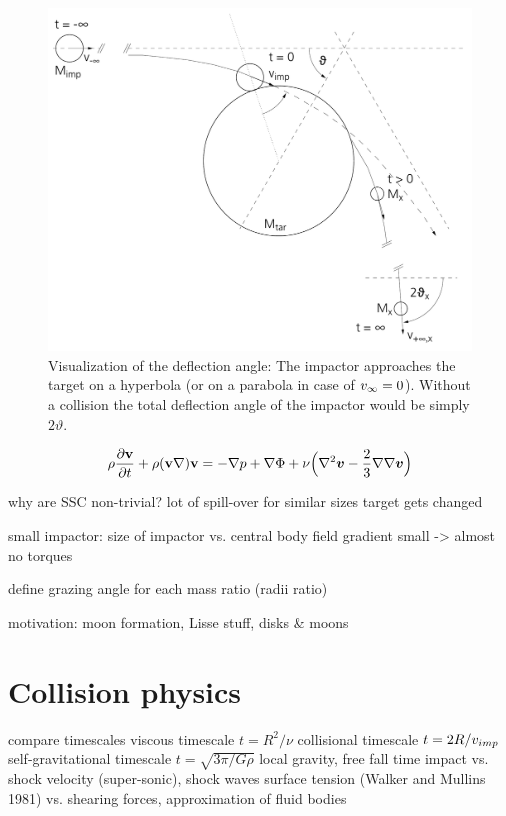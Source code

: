 \begin{figure}[htbp]
\begin{center}
\includegraphics[scale=0.5]{04_vartheta}
\caption{Visualization of the deflection angle: The impactor approaches the target on a hyperbola (or on a parabola in case of $v_{\infty} = 0$). Without a collision the total deflection angle of the impactor would be simply $2 \vartheta$.}
\label{ch03_fig02}
\end{center}
\end{figure}


\begin{equation}
\label{ch03_fld01_eq002}
\rho \frac{\partial \mathbf{v}}{\partial t} + \rho ( \mathbf{v} \nabla ) \mathbf{v} = - \nabla p + \nabla \Phi + \nu \Big( \nabla^2 \boldsymbol{v} - \frac{2}{3} \nabla \nabla \boldsymbol{v} \Big)
\end{equation}




why are SSC non-trivial?
lot of spill-over for similar sizes
target gets changed

small impactor: size of impactor vs. central body field gradient small -> almost no torques

define grazing angle for each mass ratio (radii ratio)

motivation: moon formation, Lisse stuff, disks \& moons


\section{Collision physics}
compare timescales
viscous timescale $t = R^2 / \nu$
collisional timescale $t = 2 R / v_{imp}$
self-gravitational timescale $t = \sqrt{3\pi / G \rho}$
local gravity, free fall time
impact vs. shock velocity (super-sonic), shock waves
surface tension (Walker and Mullins 1981) vs. shearing forces, approximation of fluid bodies

